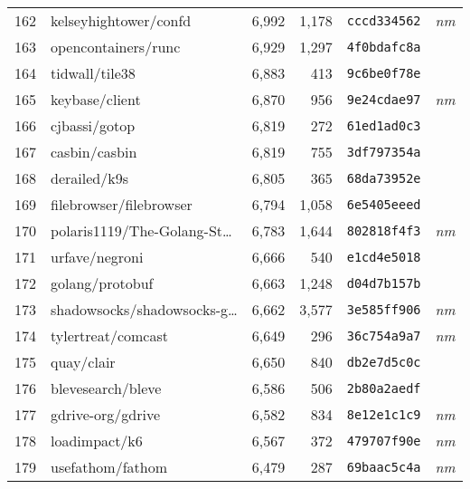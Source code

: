 {\begin{supertabular}{llrrll}
        162 &              kelseyhightower/confd &  6,992 &  1,178 &  \texttt{cccd334562} &  \textit{nm} \\
        163 &                opencontainers/runc &  6,929 &  1,297 &  \texttt{4f0bdafc8a} &              \\
        164 &                     tidwall/tile38 &  6,883 &    413 &  \texttt{9c6be0f78e} &              \\
        165 &                     keybase/client &  6,870 &    956 &  \texttt{9e24cdae97} &  \textit{nm} \\
        166 &                      cjbassi/gotop &  6,819 &    272 &  \texttt{61ed1ad0c3} &              \\
        167 &                      casbin/casbin &  6,819 &    755 &  \texttt{3df797354a} &              \\
        168 &                       derailed/k9s &  6,805 &    365 &  \texttt{68da73952e} &              \\
        169 &            filebrowser/filebrowser &  6,794 &  1,058 &  \texttt{6e5405eeed} &              \\
        170 &    polaris1119/The-Golang-St\ldots &  6,783 &  1,644 &  \texttt{802818f4f3} &  \textit{nm} \\
        171 &                     urfave/negroni &  6,666 &    540 &  \texttt{e1cd4e5018} &              \\
        172 &                    golang/protobuf &  6,663 &  1,248 &  \texttt{d04d7b157b} &              \\
        173 &    shadowsocks/shadowsocks-g\ldots &  6,662 &  3,577 &  \texttt{3e585ff906} &  \textit{nm} \\
        174 &                 tylertreat/comcast &  6,649 &    296 &  \texttt{36c754a9a7} &  \textit{nm} \\
        175 &                         quay/clair &  6,650 &    840 &  \texttt{db2e7d5c0c} &              \\
        176 &                  blevesearch/bleve &  6,586 &    506 &  \texttt{2b80a2aedf} &              \\
        177 &                  gdrive-org/gdrive &  6,582 &    834 &  \texttt{8e12e1c1c9} &  \textit{nm} \\
        178 &                      loadimpact/k6 &  6,567 &    372 &  \texttt{479707f90e} &  \textit{nm} \\
        179 &                   usefathom/fathom &  6,479 &    287 &  \texttt{69baac5c4a} &  \textit{nm} \\

\end{supertabular}}
